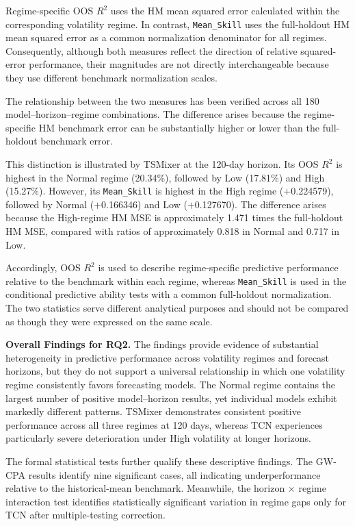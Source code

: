 \documentclass[12pt,twoside]{ord}
\begin{document}
Regime-specific OOS $R^2$ uses the HM mean squared error calculated within the corresponding volatility regime. In contrast, \texttt{Mean\_Skill} uses the full-holdout HM mean squared error as a common normalization denominator for all regimes. Consequently, although both measures reflect the direction of relative squared-error performance, their magnitudes are not directly interchangeable because they use different benchmark normalization scales.

The relationship between the two measures has been verified across all 180 model--horizon--regime combinations. The difference arises because the regime-specific HM benchmark error can be substantially higher or lower than the full-holdout benchmark error.

This distinction is illustrated by TSMixer at the 120-day horizon. Its OOS $R^2$ is highest in the Normal regime (20.34\%), followed by Low (17.81\%) and High (15.27\%). However, its \texttt{Mean\_Skill} is highest in the High regime ($+$0.224579), followed by Normal ($+$0.166346) and Low ($+$0.127670). The difference arises because the High-regime HM MSE is approximately 1.471 times the full-holdout HM MSE, compared with ratios of approximately 0.818 in Normal and 0.717 in Low.

Accordingly, OOS $R^2$ is used to describe regime-specific predictive performance relative to the benchmark within each regime, whereas \texttt{Mean\_Skill} is used in the conditional predictive ability tests with a common full-holdout normalization. The two statistics serve different analytical purposes and should not be compared as though they were expressed on the same scale.

\medskip
\noindent\textbf{Overall Findings for RQ2.}
The findings provide evidence of substantial heterogeneity in predictive performance across volatility regimes and forecast horizons, but they do not support a universal relationship in which one volatility regime consistently favors forecasting models. The Normal regime contains the largest number of positive model--horizon results, yet individual models exhibit markedly different patterns. TSMixer demonstrates consistent positive performance across all three regimes at 120 days, whereas TCN experiences particularly severe deterioration under High volatility at longer horizons.

The formal statistical tests further qualify these descriptive findings. The GW-CPA results identify nine significant cases, all indicating underperformance relative to the historical-mean benchmark. Meanwhile, the horizon $\times$ regime interaction test identifies statistically significant variation in regime gaps only for TCN after multiple-testing correction.
\end{document}
